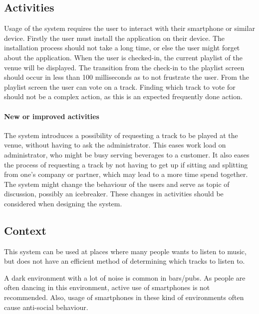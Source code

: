\subsection{Activities}
\label{sub:pact_activities}
Usage of the system requires the user to interact with their smartphone or similar device. Firstly the user must install the application on their device. The installation process should not take a long time, or else the user might forget about the application. When the user is checked-in, the current playlist of the venue will be displayed. The transition from the check-in to the playlist screen should occur in less than 100 milliseconds  as to not frustrate the user. From the playlist screen the user can vote on a track. Finding which track to vote for should not be a complex action, as this is an expected frequently done action. 

\paragraph{New or improved activities}
The system introduces a possibility of requesting a track to be played at the venue, without having to ask the administrator. This eases work load on administrator, who might be busy serving beverages to a customer. It also eases the process of requesting a track by not having to get up if sitting and splitting from one's company or partner, which may lead to a more time spend together. The system might change the behaviour of the users and serve as topic of discussion, possibly an icebreaker. These changes in activities should be considered when designing the system.

\subsection{Context}
\label{sub:pact_context}

This system can be used at places where many people wants to listen to music, but does not have an efficient method  of determining which tracks to listen to.

A dark environment with a lot of noise is common in bars/pubs. As people are often dancing in this environment, active use of smartphones is not recommended. Also, usage of smartphones in these kind of environments often cause anti-social behaviour. 

